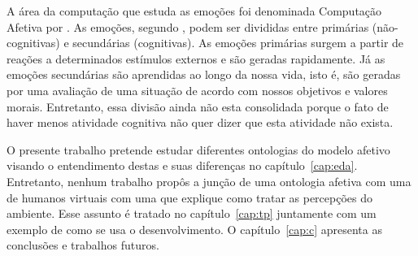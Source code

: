 
A área da computação que estuda as emoções foi denominada Computação Afetiva por
\citet{Pic98}. As emoções, segundo \citet{damasio2004erro}, podem ser divididas
entre primárias (não-cognitivas) e secundárias (cognitivas). As emoções
primárias surgem a partir de reações a determinados estímulos externos e são
geradas rapidamente. Já as emoções secundárias são aprendidas ao longo da
nossa vida, isto é, são geradas por uma avaliação de uma situação de acordo
com nossos objetivos e valores morais. Entretanto, essa divisão ainda não esta
consolidada porque o fato de haver menos atividade cognitiva não quer dizer
que esta atividade não exista.

O presente trabalho pretende estudar diferentes ontologias do modelo afetivo
visando o entendimento destas e suas diferenças no capítulo~\ref{cap:eda}.
Entretanto, nenhum trabalho propôs a junção de uma ontologia afetiva com uma
de humanos virtuais com uma que explique como tratar as percepções do
ambiente. Esse assunto é tratado no capítulo~\ref{cap:tp} juntamente com um
exemplo de como se usa o desenvolvimento. O capítulo~\ref{cap:c} apresenta as
conclusões e trabalhos futuros.
